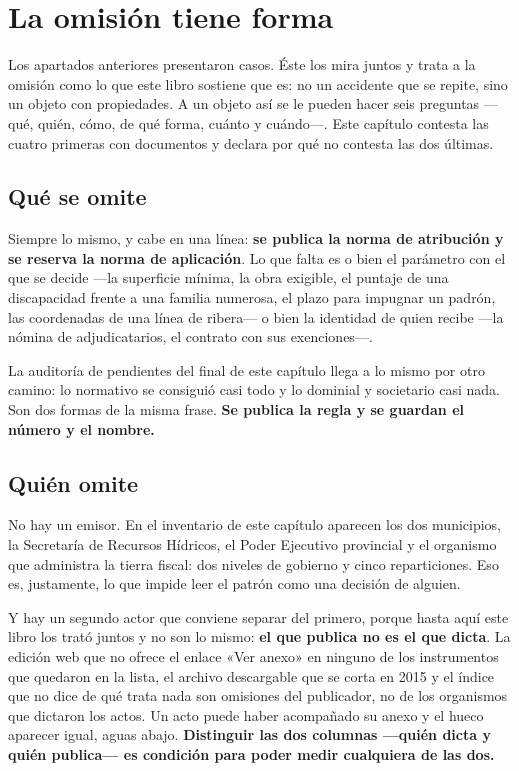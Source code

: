 \section{La omisión tiene forma}

Los apartados anteriores presentaron casos. Éste los mira juntos y trata a la omisión como lo
que este libro sostiene que es: no un accidente que se repite, sino un objeto con propiedades.
A un objeto así se le pueden hacer seis preguntas ---qué, quién, cómo, de qué forma, cuánto y
cuándo---. Este capítulo contesta las cuatro primeras con documentos y declara por qué no
contesta las dos últimas.

\subsection*{Qué se omite}

Siempre lo mismo, y cabe en una línea: \textbf{se publica la norma de atribución y se reserva
la norma de aplicación}. Lo que falta es o bien el parámetro con el que se decide ---la
superficie mínima, la obra exigible, el puntaje de una discapacidad frente a una familia
numerosa, el plazo para impugnar un padrón, las coordenadas de una línea de ribera--- o bien la
identidad de quien recibe ---la nómina de adjudicatarios, el contrato con sus exenciones---.

La auditoría de pendientes del final de este capítulo llega a lo mismo por otro camino: lo
normativo se consiguió casi todo y lo dominial y societario casi nada. Son dos formas de la
misma frase. \textbf{Se publica la regla y se guardan el número y el nombre.}

\subsection*{Quién omite}

No hay un emisor. En el inventario de este capítulo aparecen los dos municipios, la Secretaría
de Recursos Hídricos, el Poder Ejecutivo provincial y el organismo que administra la tierra
fiscal: dos niveles de gobierno y cinco reparticiones. Eso es, justamente, lo que impide leer
el patrón como una decisión de alguien.

Y hay un segundo actor que conviene separar del primero, porque hasta aquí este libro los trató
juntos y no son lo mismo: \textbf{el que publica no es el que dicta}. La edición web que no
ofrece el enlace «Ver anexo» en ninguno de los instrumentos que quedaron en la lista, el
archivo descargable que se corta en 2015 y el índice que no dice de qué trata nada son
omisiones del publicador, no de los organismos que dictaron los actos. Un acto puede haber
acompañado su anexo y el hueco aparecer igual, aguas abajo. \textbf{Distinguir las dos columnas
---quién dicta y quién publica--- es condición para poder medir cualquiera de las dos.}

